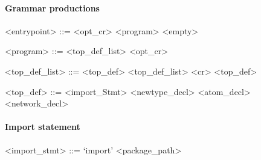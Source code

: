 \newcommand{\pn}[1]{\langle \textnormal{#1} \rangle}
\newcommand{\pp}{\models}
\newcommand{\oo}{\; \mid \;}
\newcommand{\sk}{\dots }
\newcommand{\ww}{\;}
\newcommand{\nn}{\perp}
\newcommand{\sm}[1]{\textnormal{#1}}
\newcommand{\sd}[1]{\textnormal{\it #1}}



\newcommand{\tn}[1]{`{#1}'}
\newcommand{\vs}[0]{\vspace{-12pt}}
\setlength{\grammarparsep}{20pt plus 1pt minus 1pt}
\setlength{\grammarindent}{10em}





\paragraph{Grammar productions}

\begin{grammar}
  <entrypoint> ::= <opt_cr> <program>
  \alt <empty>
\end{grammar}

\vs

\begin{grammar}
    <program> ::= <top_def_list> <opt_cr>
\end{grammar}

\vs

\begin{grammar}
  <top_def_list> ::= <top_def>
  \alt <top_def_list> <cr> <top_def>
\end{grammar}

\vs

\begin{grammar}
  <top_def> ::= <import_Stmt>
  \alt <newtype_decl>
  \alt <atom_decl>
  \alt <network_decl>
\end{grammar}


\paragraph{Import statement}

\begin{grammar}
  <import_stmt> ::= \tn{import} <package_path>
\end{grammar}


